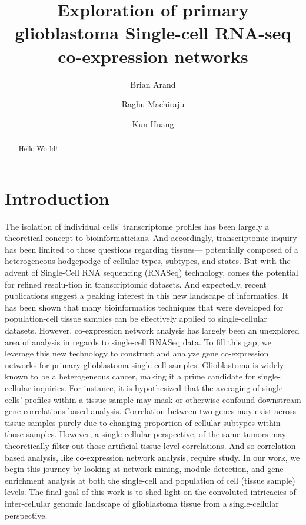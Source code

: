 \documentclass[11pt,twoside,a4paper]{article}
\begin{document}
\title{Exploration of primary glioblastoma Single-cell RNA-seq co-expression networks}
\author{Brian Arand \and Raghu Machiraju \and Kun Huang}
\maketitle

\begin{abstract}
Hello World! 
\end{abstract}

\section{Introduction}
The isolation of individual cells’ transcriptome profiles has been largely a theoretical concept to bioinformaticians. And accordingly, transcriptomic inquiry has been limited to those questions regarding tissues— potentially composed of a heterogeneous hodgepodge of cellular types, subtypes, and states. But with the advent of Single-Cell RNA sequencing (RNASeq) technology, comes the potential for refined resolu-tion in transcriptomic datasets. And expectedly, recent publications suggest a peaking interest in this new landscape of informatics. It has been shown that many bioinformatics techniques that were developed for population-cell tissue samples can be effectively applied to single-cellular datasets. However, co-expression network analysis has largely been an unexplored area of analysis in regards to single-cell RNASeq data. To fill this gap, we leverage this new technology to construct and analyze gene co-expression networks for primary glioblastoma single-cell samples. Glioblastoma is widely known to be a heterogeneous cancer, making it a prime candidate for single-cellular inquiries. For instance, it is hypothesized that the averaging of single-cells’ profiles within a tissue sample may mask or otherwise confound downstream gene correlations based analysis.  Correlation between two genes may exist across tissue samples purely due to changing proportion of cellular subtypes within those samples. However, a single-cellular perspective, of the same tumors may theoretically filter out those artificial tissue-level correlations. And so correlation based analysis, like co-expression network analysis, require study. In our work, we begin this journey by looking at network mining, module detection, and gene enrichment analysis at both the single-cell and population of cell (tissue sample) levels. The final goal of this work is to shed light on the convoluted intricacies of inter-cellular genomic landscape of glioblastoma tissue from a single-cellular perspective.
\end{document}
